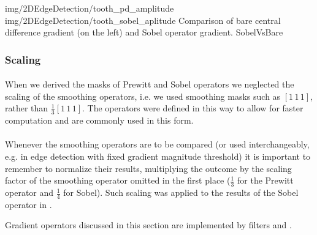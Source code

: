 \twoFigures
{img/2DEdgeDetection/tooth_pd_amplitude}
{img/2DEdgeDetection/tooth_sobel_aplitude}
{Comparison of bare central difference gradient (on the left) and Sobel operator gradient.}
{SobelVsBare}
{\basicWidth}


\subsubsection{Scaling}

\paragraph*{}
When we derived the masks of Prewitt and Sobel operators we neglected the scaling of the smoothing operators, i.e. we used smoothing masks such as $[1 \, 1 \, 1]$, rather than $\frac{1}{3} [1 \, 1 \, 1]$. The operators were defined in this way to allow for faster computation and are commonly used in this form.

\paragraph*{}
Whenever the smoothing operators are to be compared (or used interchangeably, e.g. in edge detection with fixed gradient magnitude threshold) it is important to remember to normalize their results, multiplying the outcome by the scaling factor of the smoothing operator omitted in the first place ($\frac{1}{3}$ for the Prewitt operator and $\frac{1}{4}$ for Sobel). Such scaling was applied to the results of the Sobel operator in .

\begin{refImpl}
Gradient operators discussed in this section are implemented by \studio filters  and .
\end{refImpl}